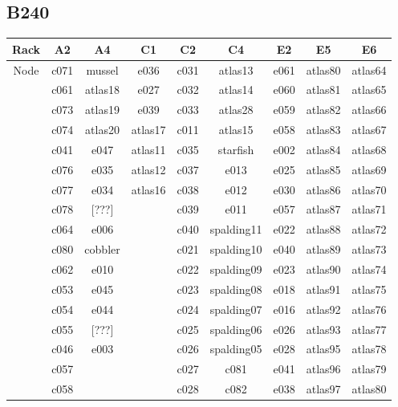 \documentclass[10pt,letterpaper]{article}
\begin{document}
    \subsection{B240}
        \begin{center}
        \begin{tabular}{ |c|c|c|c|c|c|c|c|c| }
        \hline
        Rack & A2 & A4 & C1 & C2 & C4 & E2 & E5 & E6 \\
        \hline
        \multirow{1}{3em}{Node}

        & c071 & mussel  & e036    & c031 & atlas13    & e061 & atlas80 & atlas64 \\
        & c061 & atlas18 & e027    & c032 & atlas14    & e060 & atlas81 & atlas65 \\
        & c073 & atlas19 & e039    & c033 & atlas28    & e059 & atlas82 & atlas66 \\
        & c074 & atlas20 & atlas17 & c011 & atlas15    & e058 & atlas83 & atlas67 \\
        & c041 & e047    & atlas11 & c035 & starfish   & e002 & atlas84 & atlas68 \\
        & c076 & e035    & atlas12 & c037 & e013       & e025 & atlas85 & atlas69 \\
        & c077 & e034    & atlas16 & c038 & e012       & e030 & atlas86 & atlas70 \\
        & c078 & [???]   &         & c039 & e011       & e057 & atlas87 & atlas71 \\
        & c064 & e006    &         & c040 & spalding11 & e022 & atlas88 & atlas72 \\
        & c080 & cobbler &         & c021 & spalding10 & e040 & atlas89 & atlas73 \\
        & c062 & e010    &         & c022 & spalding09 & e023 & atlas90 & atlas74 \\
        & c053 & e045    &         & c023 & spalding08 & e018 & atlas91 & atlas75 \\
        & c054 & e044    &         & c024 & spalding07 & e016 & atlas92 & atlas76 \\
        & c055 & [???]   &         & c025 & spalding06 & e026 & atlas93 & atlas77 \\
        & c046 & e003    &         & c026 & spalding05 & e028 & atlas95 & atlas78 \\
        & c057 &         &         & c027 & c081       & e041 & atlas96 & atlas79 \\
        & c058 &         &         & c028 & c082       & e038 & atlas97 & atlas80 \\

\end{tabular}
\end{center}
\end{document}
